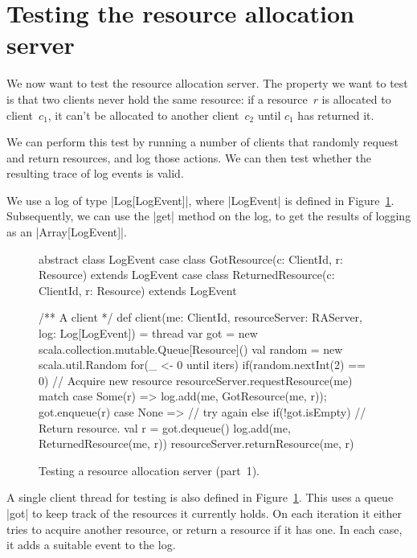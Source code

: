\section{Testing the resource allocation server}

We now want to test the resource allocation server.  The property we want to
test is that two clients never hold the same resource: if a resource~$r$ is
allocated to client~$c_1$, it can't be allocated to another client~$c_2$ until
$c_1$ has returned it.

We can perform this test by running a number of clients that randomly request
and return resources, and log those actions.  We can then test whether the
resulting trace of log events is valid.



We use a log of type |Log[LogEvent]|, where |LogEvent| is defined in
Figure~\ref{fig:RATest-1}.  Subsequently, we can use the |get| method on the
log, to get the results of logging as an |Array[LogEvent]|.


\begin{figure}
\begin{scala}
  abstract class LogEvent
  case class GotResource(c: ClientId, r: Resource) extends LogEvent
  case class ReturnedResource(c: ClientId, r: Resource) extends LogEvent

  /** A client */
  def client(me: ClientId, resourceServer: RAServer, log: Log[LogEvent]) = thread{
    var got = new scala.collection.mutable.Queue[Resource]()
    val random = new scala.util.Random
    for(_ <- 0 until iters){
      if(random.nextInt(2) == 0){ // Acquire new resource
	resourceServer.requestResource(me) match{
          case Some(r) =>  log.add(me, GotResource(me, r)); got.enqueue(r)
          case None => {}  // try again
        }
      }
      else if(!got.isEmpty){     // Return resource.
	val r = got.dequeue()
        log.add(me, ReturnedResource(me, r))
	resourceServer.returnResource(me, r)
      }
    }
  }
\end{scala}
\caption{Testing a resource allocation server (part~1).}
\label{fig:RATest-1}
\end{figure}


A single client thread for testing is also defined in
Figure~\ref{fig:RATest-1}.   This uses a
queue |got| to keep track of the resources it currently holds.  On each
iteration it either tries to acquire another resource, or return a resource if
it has one.  In each case, it adds a suitable event to the log.

